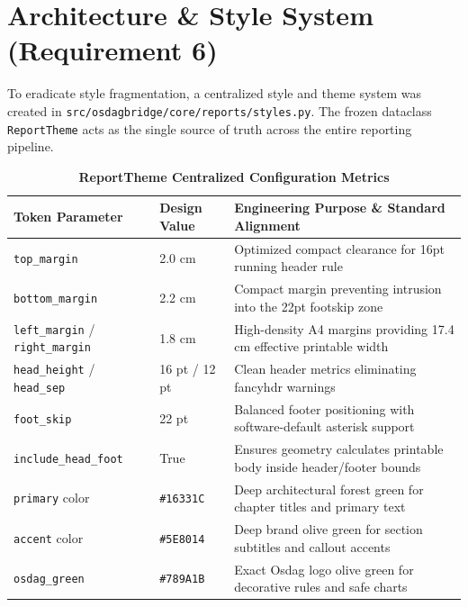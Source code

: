 \documentclass[12pt,a4paper]{article}
\begin{document}
\section{Architecture \& Style System (Requirement 6)}

To eradicate style fragmentation, a centralized style and theme system was created in \nolinkurl{src/osdagbridge/core/reports/styles.py}. The frozen dataclass \texttt{ReportTheme} acts as the single source of truth across the entire reporting pipeline.

\begin{table}[htbp]
  \centering
  \caption{\textbf{ReportTheme Centralized Configuration Metrics}}
  \label{tab:theme-metrics}
  \vspace{0.2cm}
  \begin{tabularx}{\textwidth}{|l|l|X|}
    \hline
    \rowcolor{OsdagHeaderBg}
    \textbf{Token Parameter} & \textbf{Design Value} & \textbf{Engineering Purpose \& Standard Alignment} \\
    \hline
    \texttt{top\_margin} & 2.0 cm & Optimized compact clearance for 16pt running header rule \\
    \hline
    \rowcolor{OsdagZebra}
    \texttt{bottom\_margin} & 2.2 cm & Compact margin preventing intrusion into the 22pt footskip zone \\
    \hline
    \texttt{left\_margin} / \texttt{right\_margin} & 1.8 cm & High-density A4 margins providing 17.4 cm effective printable width \\
    \hline
    \rowcolor{OsdagZebra}
    \texttt{head\_height} / \texttt{head\_sep} & 16 pt / 12 pt & Clean header metrics eliminating fancyhdr warnings \\
    \hline
    \texttt{foot\_skip} & 22 pt & Balanced footer positioning with software-default asterisk support \\
    \hline
    \rowcolor{OsdagZebra}
    \texttt{include\_head\_foot} & True & Ensures geometry calculates printable body inside header/footer bounds \\
    \hline
    \texttt{primary} color & \texttt{\#16331C} & Deep architectural forest green for chapter titles and primary text \\
    \hline
    \rowcolor{OsdagZebra}
    \texttt{accent} color & \texttt{\#5E8014} & Deep brand olive green for section subtitles and callout accents \\
    \hline
    \texttt{osdag\_green} & \texttt{\#789A1B} & Exact Osdag logo olive green for decorative rules and safe charts \\

\end{tabularx}
\end{table}
\end{document}
